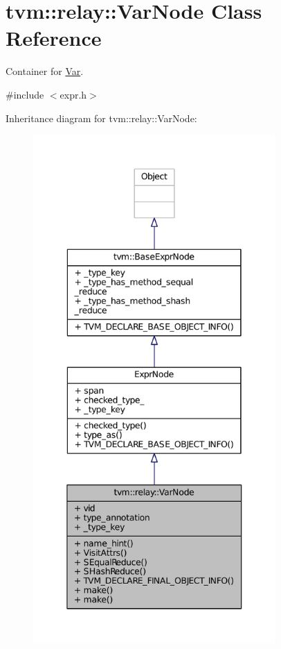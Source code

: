 \hypertarget{classtvm_1_1relay_1_1VarNode}{}\section{tvm\+:\+:relay\+:\+:Var\+Node Class Reference}
\label{classtvm_1_1relay_1_1VarNode}


Container for \hyperlink{classtvm_1_1relay_1_1Var}{Var}.  




{\ttfamily \#include $<$expr.\+h$>$}



Inheritance diagram for tvm\+:\+:relay\+:\+:Var\+Node\+:
\nopagebreak
\begin{figure}[H]
\begin{center}
\leavevmode
\includegraphics[height=550pt]{classtvm_1_1relay_1_1VarNode__inherit__graph}
\end{center}
\end{figure}



